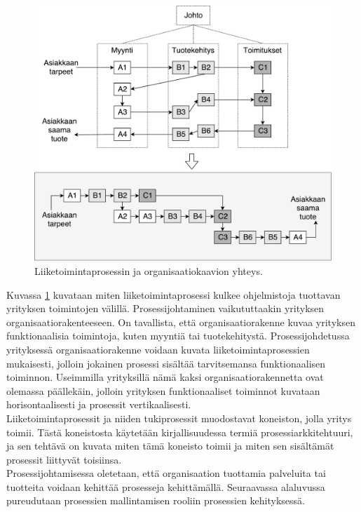 \documentclass[finnish,12pt,a4paper,pdftex]{article}
\begin{document}
\begin{figure}[!h]
    \centering
    \includegraphics[scale=0.45]{images/Prosessikaavion.pdf}
    \caption{Liiketoimintaprosessin ja organisaatiokaavion yhteys. \citep{ohjelmistotuotanto}}
    \label{fig:liikark}
\end{figure}

Kuvassa \ref{fig:liikark} kuvataan miten liiketoimintaprosessi kulkee ohjelmistoja tuottavan yrityksen toimintojen välillä. Prosessijohtaminen vaikututtaakin yrityksen organisaatiorakenteeseen. On tavallista, että organisaatiorakenne kuvaa yrityksen funktionaalisia toimintoja, kuten myyntiä tai tuotekehitystä. Prosessijohdetussa yrityksessä organisaatiorakenne voidaan kuvata liiketoimintaprosessien mukaisesti, jolloin jokainen prosessi sisältää tarvitsemansa funktionaalisen toiminnon. Useimmilla yrityksillä nämä kaksi organisaatiorakennetta ovat olemassa päällekäin, jolloin yrityksen funktionaaliset toiminnot kuvataan horisontaalisesti ja prosessit vertikaalisesti. \citep{vanhatorre}\\

Liiketoimintaprosessit ja niiden tukiprosessit muodostavat koneiston, jolla yritys toimii. Tästä koneistosta käytetään kirjallisuudessa termiä prosessiarkkitehtuuri, ja sen tehtävä on kuvata miten tämä koneisto toimii ja miten sen sisältämät prosessit liittyvät toisiinsa.\\

Prosessijohtamisessa oletetaan, että organisaation tuottamia palveluita tai tuotteita voidaan kehittää prosesseja kehittämällä. Seuraavassa alaluvussa pureudutaan prosessien mallintamisen rooliin prosessien kehityksessä.
\end{document}

